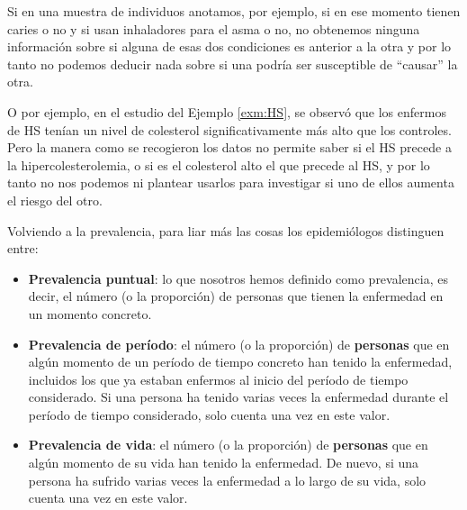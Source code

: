 \documentclass[
]{book}
\theoremstyle{definition}
\theoremstyle{definition}
\theoremstyle{definition}
\theoremstyle{definition}
\theoremstyle{remark}
\begin{document}
Si en una muestra de individuos anotamos, por ejemplo, si en ese momento tienen caries o no y si usan inhaladores para el asma o no, no obtenemos ninguna información sobre si alguna de esas dos condiciones es anterior a la otra y por lo tanto no podemos deducir nada sobre si una podría ser susceptible de ``causar'' la otra.

O por ejemplo, en el estudio del Ejemplo \ref{exm:HS}, se observó que los enfermos de HS tenían un nivel de colesterol significativamente más alto que los controles. Pero la manera como se recogieron los datos no permite saber si el HS precede a la hipercolesterolemia, o si es el colesterol alto el que precede al HS, y por lo tanto no nos podemos ni plantear usarlos para investigar si uno de ellos aumenta el riesgo del otro.

\begin{rmdromans}
Volviendo a la prevalencia, para liar más las cosas los epidemiólogos distinguen entre:

\begin{itemize}
\item
  \textbf{Prevalencia puntual}: lo que nosotros hemos definido como prevalencia, es decir, el número (o la proporción) de personas que tienen la enfermedad en un momento concreto.
\item
  \textbf{Prevalencia de período}: el número (o la proporción) de \textbf{personas} que en algún momento de un período de tiempo concreto han tenido la enfermedad, incluidos los que ya estaban enfermos al inicio del período de tiempo considerado. Si una persona ha tenido varias veces la enfermedad durante el período de tiempo considerado, solo cuenta una vez en este valor.
\item
  \textbf{Prevalencia de vida}: el número (o la proporción) de \textbf{personas} que en algún momento de su vida han tenido la enfermedad. De nuevo, si una persona ha sufrido varias veces la enfermedad a lo largo de su vida, solo cuenta una vez en este valor.
\end{itemize}
\end{rmdromans}
\end{document}
